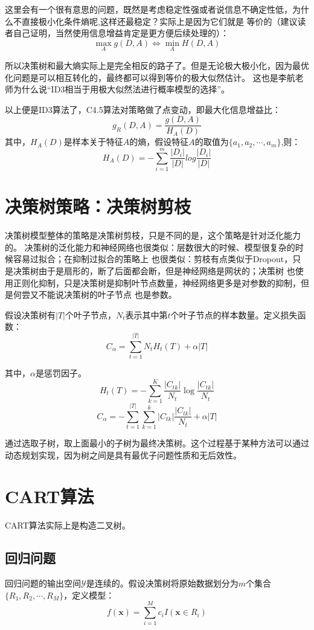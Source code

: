 \documentclass{article}
\begin{document}
        这里会有一个很有意思的问题，既然是考虑稳定性强或者说信息不确定性低，为什么不直接极小化条件熵呢,这样还最稳定？实际上是因为它们就是
        等价的（建议读者自己证明，当然使用信息增益肯定是更方便后续处理的）：
        \[\max_A g(D,A)  \Leftrightarrow \min_A H(D,A)\]

        所以决策树和最大熵实际上是完全相反的路子了。但是无论极大极小化，因为最优化问题是可以相互转化的，最终都可以得到等价的极大似然估计。
        这也是李航老师为什么说“ID3相当于用极大似然法进行概率模型的选择”。

        以上便是ID3算法了，C4.5算法对策略做了点变动，即最大化信息增益比：
        \[g_R(D,A)=\frac{g(D,A)}{H_A(D)}\]
        其中，$H_A(D)$是样本关于特征$A$的熵，假设特征$A$的取值为$\{a_1,a_2,\cdots,a_m\}$,则：
        \[H_A(D)=-\sum_{i=1}^{m}\frac{\left|D_i\right|}{\left|D\right|}log \frac{\left|D_i\right|}{\left|D\right|}\]

    \section{决策树策略：决策树剪枝}
        决策树模型整体的策略是决策树剪枝，只是不同的是，这个策略是针对泛化能力的。
        决策树的泛化能力和神经网络也很类似：层数很大的时候、模型很复杂的时候容易过拟合；在抑制过拟合的策略上
        也很类似：剪枝有点类似于Dropout，只是决策树由于是扇形的，断了后面都会断，但是神经网络是网状的；决策树
        也使用正则化抑制，只是决策树是抑制叶节点数量，神经网络更多是对参数的抑制，但是何尝又不能说决策树的叶子节点
        也是参数。
        
        假设决策树有$\left|T\right|$个叶子节点，$N_t$表示其中第$t$个叶子节点的样本数量。定义损失函数：
        \[C_\alpha=\sum_{t=1}^{\left|T\right|}N_tH_t(T)+\alpha\left|T\right|\]

        其中，$\alpha$是惩罚因子。
        \[H_t(T)=-\sum_{k=1}^{K}\frac{\left|C_{tk}\right|}{N_t}\log \frac{\left|C_{tk}\right|}{N_t}\]
        \[C_\alpha=-\sum_{t=1}^{\left|T\right|}\sum_{k=1}^{k}\left|C_{tk}\right|\frac{\left|C_{tk}\right|}{N_t}+\alpha\left|T\right|\]

        通过选取子树，取上面最小的子树为最终决策树。这个过程基于某种方法可以通过动态规划实现，因为树之间是具有最优子问题性质和无后效性。

    \section{CART算法}
        CART算法实际上是构造二叉树。

        \subsection{回归问题}
        回归问题的输出空间$\mathcal{Y}$是连续的。假设决策树将原始数据划分为$m$个集合$\{R_1,R_2,\cdots,R_M\}$，定义模型：
        \[f(\boldsymbol{x})=\sum_{i=1}^{M}c_iI(\boldsymbol{x}\in R_i)\]
\end{document}

